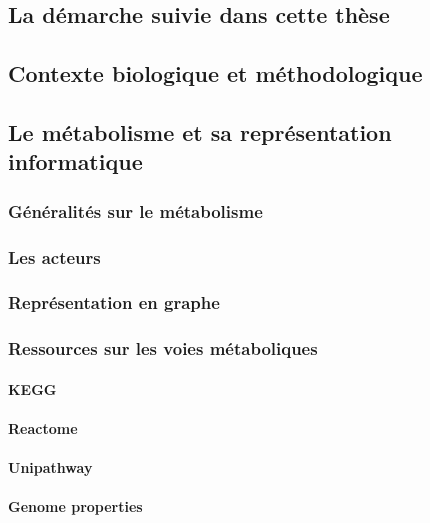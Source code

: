
\section*{La démarche suivie dans cette thèse}
\begin{refsection}
\chapter{Contexte biologique et méthodologique }

\section{Le métabolisme et sa représentation informatique}
\subsection{Généralités sur le métabolisme}
\subsection{Les acteurs}
\subsection{Représentation en graphe}
\subsection{Ressources sur les voies métaboliques}
\subsubsection{KEGG}
\subsubsection{Reactome}
\subsubsection{Unipathway}
\subsubsection{Genome properties}


\end{refsection}
